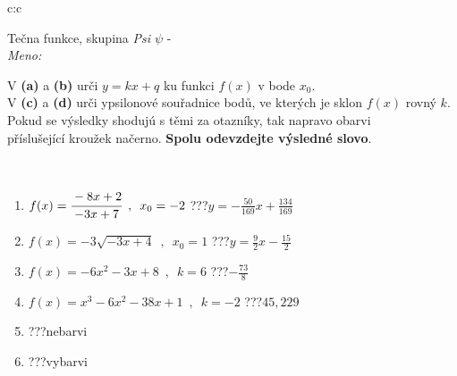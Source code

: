 \documentclass[10pt]{report}
\begin{document}
\newpage
\thispagestyle{empty}
\begin{tabular}{c:c}
\begin{minipage}[c][104.5mm][t]{0.5\linewidth}
\begin{center}
\vspace{7mm}
{\huge Tečna funkce, skupina \textit{Psi $\psi$} -}\\[5mm]
\textit{Meno:}\phantom{xxxxxxxxxxxxxxxxxxxxxxxxxxxxxxxxxxxxxxxxxxxxxxxxxxxxxxxxxxxxxxxxx}\\[5mm]
\begin{minipage}{0.95\linewidth}
\begin{center}
V \textbf{(a)} a \textbf{(b)} urči  $y = kx + q$ ku funkci $f(x)$ v bode $x_0$.\\V \textbf{(c)} a \textbf{(d)} urči ypsilonové souřadnice bodů, ve kterých je sklon $f(x)$ rovný $k$.\\Pokud se výsledky shodujú s těmi za otazníky, tak napravo obarvi\\příslušející kroužek načerno. \textbf{Spolu odevzdejte výsledné slovo}.
\end{center}
\end{minipage}
\\[1mm]
\begin{minipage}{0.79\linewidth}
\begin{center}
\begin{varwidth}{\linewidth}
\begin{enumerate}
\small
\item $f(x)=\cfrac{-8x+2}{-3x+7}\enspace , \enspace x_0=-2$\quad \dotfill\; ???\;\dotfill \quad $y = -\frac{50}{169}x+\frac{134}{169}$
\item $f(x)=-3\sqrt{-3x+4}\enspace , \enspace x_0=1$\quad \dotfill\; ???\;\dotfill \quad $y = \frac{9}{2}x-\frac{15}{2}$
\item $f(x)=-6x^2-3x+8\enspace , \enspace k=6$\quad \dotfill\; ???\;\dotfill \quad $-\frac{73}{8}$
\item $f(x)=x^3-6x^2-38x+1\enspace , \enspace k=-2$\quad \dotfill\; ???\;\dotfill \quad $45 , 229$
\item \quad \dotfill\; ???\;\dotfill \quad nebarvi
\item \quad \dotfill\; ???\;\dotfill \quad vybarvi
\end{enumerate}
\end{varwidth}
\end{center}
\end{minipage}
\begin{minipage}{0.20\linewidth}

\end{minipage}
\end{center}
\end{minipage}
\end{tabular}
\end{document}
